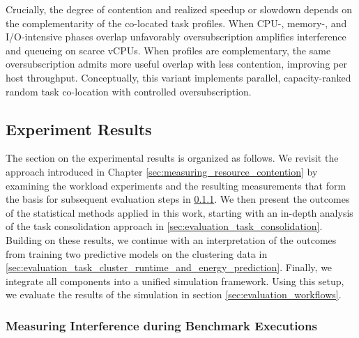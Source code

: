 Crucially, the degree of contention and realized speedup or slowdown depends on the complementarity of the co-located task profiles. When CPU-, memory-, and I/O-intensive phases overlap unfavorably oversubscription amplifies interference and queueing on scarce vCPUs. When profiles are complementary, the same oversubscription admits more useful overlap with less contention, improving per host throughput. Conceptually, this variant implements parallel, capacity-ranked random task co-location with controlled oversubscription.

\subsection{Experiment Results}
\label{sec:experiment_results}
The section on the experimental results is organized as follows. We revisit the approach introduced in Chapter \ref{sec:measuring_resource_contention} by examining the workload experiments and the resulting measurements that form the basis for subsequent evaluation steps in \ref{sec:resource_contention_analysis}. We then present the outcomes of the statistical methods applied in this work, starting with an in-depth analysis of the task consolidation approach in \ref{sec:evaluation_task_consolidation}. Building on these results, we continue with an interpretation of the outcomes from training two predictive models on the clustering data in \ref{sec:evaluation_task_cluster_runtime_and_energy_prediction}. Finally, we integrate all components into a unified simulation framework. Using this setup, we evaluate the results of the simulation in section \ref{sec:evaluation_workflows}.
\subsubsection{Measuring Interference during Benchmark Executions}
\label{sec:resource_contention_analysis}


